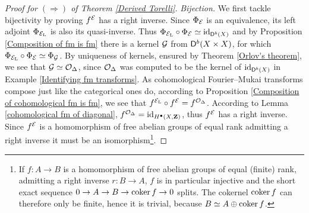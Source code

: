 \begin{proof}[Proof for $(\Rightarrow)$ of Theorem \ref{Derived Torelli}]
    \vspace{0.3 cm}
    \noindent
    \textsl{Bijection.}
    We first tackle bijectivity
    by proving $f^{\mathcal E}$ has a right inverse. Since $\Phi_{\mathcal E}$ is an equivalence, its left adjoint $\Phi_{\mathcal E_\mathrm{L}}$ is also its quasi-inverse. 
    Thus $\Phi_{\mathcal E_\mathrm{L}} \circ \Phi_{\mathcal E} \simeq \operatorname{id}_{\mathsf{D}^b(X)}$ and by Proposition \ref{Composition of fm is fm} there is a kernel $\mathcal G$ from $\mathsf{D}^b(X \times X)$, for which $\Phi_{\mathcal E_\mathrm{L}} \circ \Phi_{\mathcal E} \simeq \Phi_{\mathcal G}$. By uniqueness of kernels, ensured by Theorem \ref{Orlov's theorem}, we see that $\mathcal G \simeq {\mathcal{O}_{\Delta}}$, since ${\mathcal{O}_{\Delta}}$ was computed to be the kernel of $\operatorname{id}_{\mathsf{D}^b(X)}$ in Example \ref{Identifying fm transforms}. As cohomological Fourier--Mukai transforms compose just like the categorical ones do, according to Proposition \ref{Composition of cohomological fm is fm}, we see that $f^{\mathcal E_\mathrm{L}} \circ f^{\mathcal E} = f^{{\mathcal{O}_{\Delta}}}$. According to Lemma \ref{cohomological fm of diagonal}, $f^{{\mathcal{O}_{\Delta}}} = \operatorname{id}_{H^{\bullet}(X, \mathbf Z)}$, thus $f^{\mathcal E}$ has a right inverse. Since $f^{\mathcal E}$ is a homomorphism of free abelian groups of equal rank admitting a right inverse it must be an isomorphism\footnote{
        If $f \colon A \to B$ is a homomorphism of free abelian groups of equal (finite) rank, admitting a right inverse $r \colon B \to A$, $f$ is in particular injective and the short exact sequence $0 \to A \to B \to \operatorname{coker} f \to 0$ splits. The cokernel $\operatorname{coker} f$ can therefore only be finite, hence it is trivial, because $B \simeq A \oplus \operatorname{coker} f$.
    }.
    

\end{proof}

